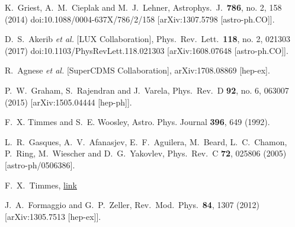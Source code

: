   K.~Griest, A.~M.~Cieplak and M.~J.~Lehner,
  Astrophys.\ J.\  {\bf 786}, no. 2, 158 (2014)
  doi:10.1088/0004-637X/786/2/158
  [arXiv:1307.5798 [astro-ph.CO]].

  D.~S.~Akerib {\it et al.} [LUX Collaboration],
  Phys.\ Rev.\ Lett.\  {\bf 118}, no. 2, 021303 (2017)
  doi:10.1103/PhysRevLett.118.021303
  [arXiv:1608.07648 [astro-ph.CO]].

  R.~Agnese {\it et al.} [SuperCDMS Collaboration],
  arXiv:1708.08869 [hep-ex].

  P.~W.~Graham, S.~Rajendran and J.~Varela,
  Phys.\ Rev.\ D {\bf 92}, no. 6, 063007 (2015)
  [arXiv:1505.04444 [hep-ph]].


 F.~X. Timmes and S.~E. Woosley, Astro. Phys. Journal {\bf 396}, 649 (1992).

  L.~R.~Gasques, A.~V.~Afanasjev, E.~F.~Aguilera, M.~Beard, L.~C.~Chamon, P.~Ring, M.~Wiescher and D.~G.~Yakovlev,
  Phys.\ Rev.\ C {\bf 72}, 025806 (2005)
  [astro-ph/0506386].


F.~X.~Timmes, \href{http://cococubed.asu.edu/code_pages/coldwd.shtml}{link}

  J.~A.~Formaggio and G.~P.~Zeller,
  Rev.\ Mod.\ Phys.\  {\bf 84}, 1307 (2012)
  [arXiv:1305.7513 [hep-ex]].
  
